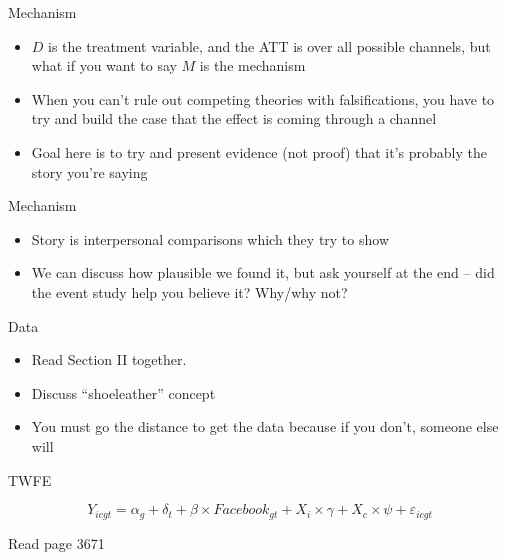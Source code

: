 \documentclass{beamer}
\begin{document}
\begin{frame}{Mechanism}

\begin{itemize}
\item $D$ is the treatment variable, and the ATT is over all possible channels, but what if you want to say $M$ is the mechanism
\item When you can't rule out competing theories with falsifications, you have to try and build the case that the effect is coming through a channel
\item Goal here is to try and present evidence (not proof) that it's probably the story you're saying

\end{itemize}

\end{frame}




\begin{frame}{Mechanism}

\begin{itemize}

\item Story is interpersonal comparisons which they try to show 
\item We can discuss how plausible we found it, but ask yourself at the end -- did the event study help you believe it?  Why/why not?

\end{itemize}

\end{frame}

\begin{frame}{Data}

\begin{itemize}

\item Read Section II together.  
\item Discuss ``shoeleather'' concept
\item You must go the distance to get the data because if you don't, someone else will

\end{itemize}

\end{frame}


\begin{frame}{TWFE}

\begin{equation}
Y_{icgt} = \alpha_g + \delta_t + \beta \times Facebook_{gt} + X_i \times \gamma + X_c \times \psi + \varepsilon_{icgt}
\end{equation}

\bigskip

Read page 3671

\end{frame}
\end{document}
